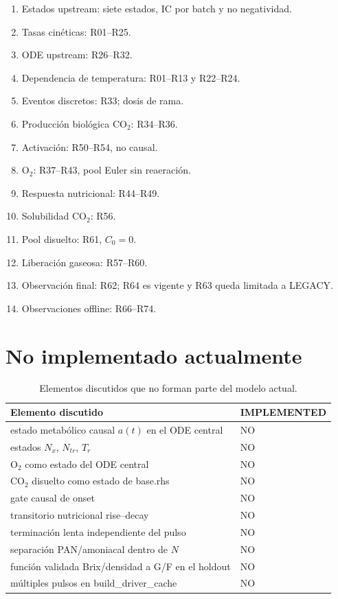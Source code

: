 \documentclass[11pt]{article}
\newcommand{\code}[1]{{\small\ttfamily #1}}
\newcommand{\tablehead}[1]{\textcolor{auditblue}{\sffamily\bfseries #1}}
\begin{document}
\begin{enumerate}[label=\Alph*.]
\item Estados upstream: siete estados, IC por batch y no negatividad.
\item Tasas cinéticas: R01--R25.
\item ODE upstream: R26--R32.
\item Dependencia de temperatura: R01--R13 y R22--R24.
\item Eventos discretos: R33; dosis de rama.
\item Producción biológica CO$_2$: R34--R36.
\item Activación: R50--R54, no causal.
\item O$_2$: R37--R43, pool Euler sin reaeración.
\item Respuesta nutricional: R44--R49.
\item Solubilidad CO$_2$: R56.
\item Pool disuelto: R61, $C_0=0$.
\item Liberación gaseosa: R57--R60.
\item Observación final: R62; R64 es vigente y R63 queda limitada a LEGACY.
\item Observaciones offline: R66--R74.
\end{enumerate}

\section{No implementado actualmente}

\begin{table}[H]
\centering
\caption{Elementos discutidos que no forman parte del modelo actual.}
\label{tab:no-implementado}
\begin{tabularx}{\textwidth}{Y>{\centering\arraybackslash}p{0.18\textwidth}}
\toprule
\tablehead{Elemento discutido} & \tablehead{IMPLEMENTED} \\
\midrule
estado metabólico causal $a(t)$ en el ODE central & NO \\
estados $N_x$, $N_{tr}$, $T_r$ & NO \\
O$_2$ como estado del ODE central & NO \\
CO$_2$ disuelto como estado de \code{base.rhs} & NO \\
gate causal de onset & NO \\
transitorio nutricional rise--decay & NO \\
terminación lenta independiente del pulso & NO \\
separación PAN/amoniacal dentro de $N$ & NO \\
función validada Brix/densidad a G/F en el holdout & NO \\
múltiples pulsos en \code{build\_driver\_cache} & NO \\
\bottomrule
\end{tabularx}
\end{table}
\end{document}
